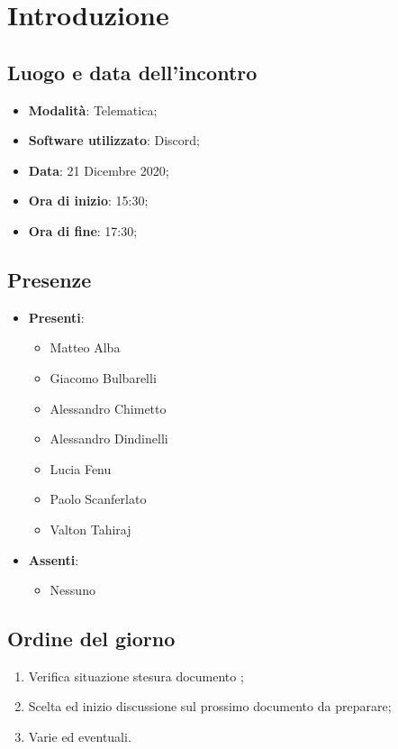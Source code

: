 \documentclass[]{article}
\begin{document}
	
	
	
	\newpage
	
	\section{Introduzione}
		\subsection{Luogo e data dell'incontro}
		\begin{itemize}
			\item \textbf{Modalità}: Telematica;
			\item \textbf{Software utilizzato}: Discord;
			\item \textbf{Data}: 21 Dicembre 2020;
			\item \textbf{Ora di inizio}: 15:30;
			\item \textbf{Ora di fine}: 17:30;
		\end{itemize}

		\subsection{Presenze}
		\begin{itemize}
			\item \textbf{Presenti}:
		\begin{itemize}
			\item Matteo Alba
			\item Giacomo Bulbarelli
			\item Alessandro Chimetto
			\item Alessandro Dindinelli
			\item Lucia Fenu
			\item Paolo Scanferlato
			\item Valton Tahiraj
		\end{itemize}
			\item \textbf{Assenti}:
			\begin{itemize}
				\item Nessuno
			\end{itemize}
		\end{itemize}
	
		\subsection{Ordine del giorno}
		\begin{enumerate}
			\item Verifica situazione stesura documento ;
			\item Scelta ed inizio discussione sul prossimo documento da preparare;
			\item Varie ed eventuali.
		\end{enumerate}
	
\end{document}
